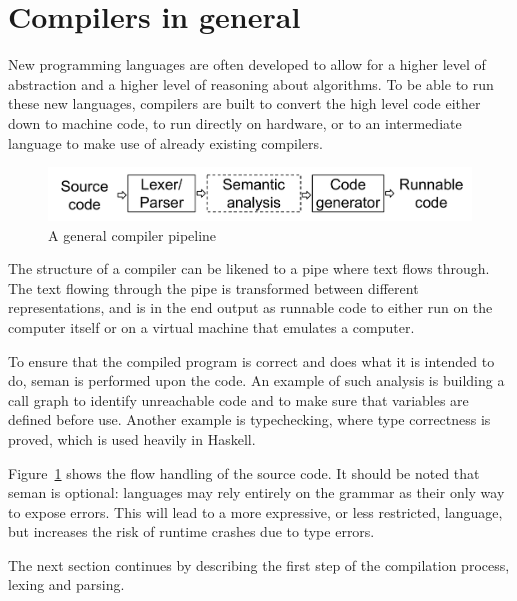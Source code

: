 \section{Compilers in general}

New programming languages are often developed to allow for a higher level of abstraction and a higher level of reasoning about algorithms. To be able to run these new languages, compilers are built to convert the high level code either down to machine code, to run directly on hardware, or to an intermediate language to make use of already existing compilers.

\begin{figure}[!ht]
  \centering
  \includegraphics[width=0.6\pdfpagewidth]{figure/generalpipeline}
  \caption{A general compiler pipeline}
  \label{fig:generalpipeline}
\end{figure}

The structure of a compiler can be likened to a pipe where text flows through. The text flowing through the pipe is transformed between different representations, and is in the end output as runnable code to either run on the computer itself or on a virtual machine that emulates a computer. 

To ensure that the compiled program is correct and does what it is intended to do, \gls{seman} is performed upon the code. An example of such analysis is building a call graph to identify unreachable code and to make sure that variables are defined before use. Another example is \gls{typechecking}, where type correctness is proved, which is used heavily in Haskell.

Figure~\ref{fig:generalpipeline} shows the flow handling of the source code. It should be noted that \gls{seman} is optional: languages may rely entirely on the grammar as their only way to expose errors. This will lead to a more expressive, or less restricted, language, but increases the risk of runtime crashes due to type errors.

The next section continues by describing the first step of the compilation process, lexing and parsing.
